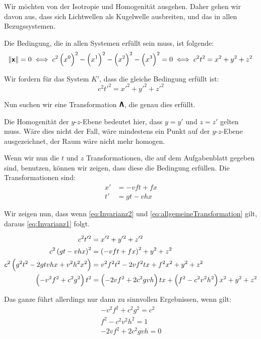 Wir möchten von der Isotropie und Homogenität ausgehen. Daher gehen wir davon
aus, dass sich Lichtwellen als Kugelwelle ausbreiten, und das in allen
Bezugssystemen.

Die Bedingung, die in allen Systemen erfüllt sein muss, ist folgende:
\begin{equation}
	\label{eq:Invarianz1}
	\norm{\tens x} = 0
	\iff
	c^2 \del{x^0}^2 - \del{x^1}^2 - \del{x^2}^2 - \del{x^3}^2 = 0
	\iff
	c^2 t^2 = x^2 + y^2 + z^2
\end{equation}

Wir fordern für das System $K'$, dass die gleiche Bedingung erfüllt ist:
\begin{equation}
	\label{eq:Invarianz2}
	c^2 t'^2 = x'^2 + y'^2 + z'^2
\end{equation}

Nun suchen wir eine Transformation $\boldsymbol{\mathsf{\Lambda}}$, die genau dies erfüllt.

Die Homogenität der $y$-$z$-Ebene bedeutet hier, dass $y = y'$ und $z = z'$
gelten muss. Wäre dies nicht der Fall, wäre mindestens ein Punkt auf der
$y$-$z$-Ebene ausgezeichnet, der Raum wäre nicht mehr homogen.

Wenn wir nun die $t$ und $z$ Transformationen, die auf dem Aufgabenblatt
gegeben sind, benutzen, können wir zeigen, dass diese die Bedingung erfüllen.
Die Transformationen sind:
\begin{subequations}
	\label{eq:allgemeineTransformation}
	\begin{align}
		x' &= - v f t +   f x \\
		t' &=     g t - v h x
	\end{align}
\end{subequations}

Wir zeigen nun, dass wenn \eqref{eq:Invarianz2} und
\eqref{eq:allgemeineTransformation} gilt, daraus \eqref{eq:Invarianz1} folgt.

\begin{align*}
	c^2 t'^2 &= x'^2 + y'^2 + z'^2 \\
	c^2 \del{g t - v h x}^2 &= \del{- v f t +   f x}^2 + y^2 + z^2 \\
	c^2 \del{g^2 t^2 - 2 gtvhx + v^2h^2x^2} &= v^2 f^2 t^2 - 2 v f^2 tx + f^2 x^2 + y^2 + z^2 \\
\del{- v^2 f^2 + c^2 g^2} t^2 &=  \del{- 2 v f^2 + 2 c^2gvh} tx + \del{f^2- c^2v^2h^2} x^2 + y^2 + z^2
\end{align*}

Das ganze führt allerdings nur dann zu sinnvollen Ergebnissen, wenn gilt:
\begin{gather*}
	- v^2 f^2 + c^2 g^2 = c^2 \\
	f^2- c^2v^2h^2 = 1 \\
	- 2 v f^2 + 2 c^2gvh = 0
\end{gather*}

